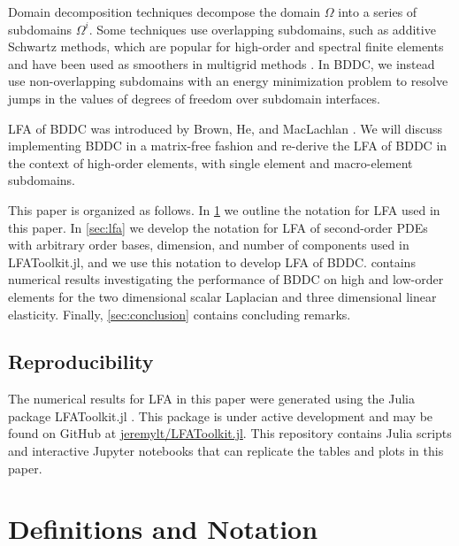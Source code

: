 \documentclass[review]{siamart190516}
\begin{document}
Domain decomposition techniques decompose the domain $\Omega$ into a series of subdomains $\Omega^i$.
Some techniques use overlapping subdomains, such as additive Schwartz methods, which are popular for high-order and spectral finite elements \cite{fischer1997overlapping} and have been used as smoothers in multigrid methods \cite{fischer2005hybrid}.
In BDDC, we instead use non-overlapping subdomains with an energy minimization problem to resolve jumps in the values of degrees of freedom over subdomain interfaces.

LFA of BDDC was introduced by Brown, He, and MacLachlan \cite{brown2019local}.
We will discuss implementing BDDC in a matrix-free fashion and re-derive the LFA of BDDC in the context of high-order elements, with single element and macro-element subdomains.

This paper is organized as follows.
In \cref{sec:notation} we outline the notation for LFA used in this paper.
In \cref{sec:lfa} we develop the notation for LFA of second-order PDEs with arbitrary order bases, dimension, and number of components used in LFAToolkit.jl, and we use this notation to develop LFA of BDDC.
 contains numerical results investigating the performance of BDDC on high and low-order elements for the two dimensional scalar Laplacian and three dimensional linear elasticity.
Finally, \cref{sec:conclusion} contains concluding remarks.

\subsection{Reproducibility}\label{sec:reproducibility}

The numerical results for LFA in this paper were generated using the Julia package LFAToolkit.jl \cite{thompson2021toolkit}.
This package is under active development and may be found on GitHub at \href{https://github.com/jeremylt/LFAToolkit.jl}{jeremylt/LFAToolkit.jl}.
This repository contains Julia scripts and interactive Jupyter notebooks that can replicate the tables and plots in this paper.

\section{Definitions and Notation}\label{sec:notation}
\end{document}

